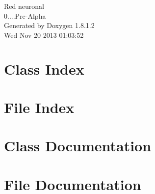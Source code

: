 \documentclass{book}
\begin{document}
\hypersetup{pageanchor=false,citecolor=blue}
\begin{titlepage}
\vspace*{7cm}
\begin{center}
{\Large Red neuronal \\[1ex]\large 0....\-Pre-\/\-Alpha }\\
\vspace*{1cm}
{\large Generated by Doxygen 1.8.1.2}\\
\vspace*{0.5cm}
{\small Wed Nov 20 2013 01:03:52}\\
\end{center}
\end{titlepage}
\clearemptydoublepage
{}
\tableofcontents
\clearemptydoublepage
{}
\hypersetup{pageanchor=true,citecolor=blue}
\chapter{Class Index}

\chapter{File Index}

\chapter{Class Documentation}





\chapter{File Documentation}















\printindex
\end{document}
